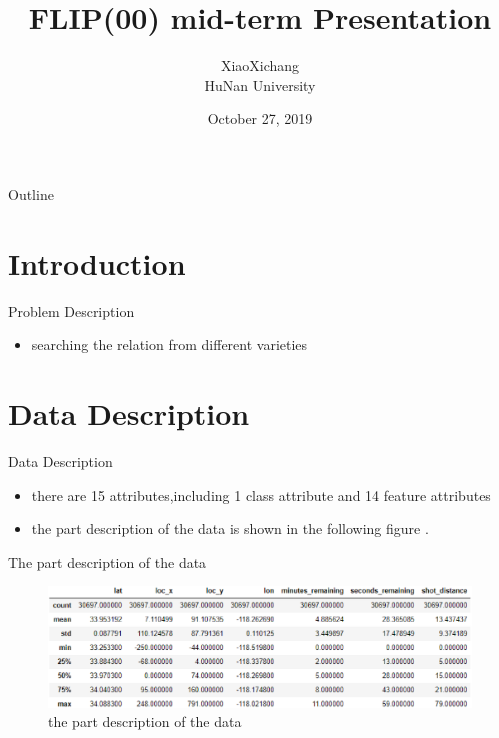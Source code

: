 \documentclass[
 size=14pt,
 paper=smartboard, %
 mode=present, %
 display=slides, %
style=tuliplab,
pauseslide,
fleqn,leqno]{powerdot}
\title{FLIP(00) mid-term Presentation}
\author{
XiaoXichang
\\
HuNan University 
}
\date{October 27, 2019}
\begin{document}
\maketitle 

\begin{slide}[toc=,bm=]{Outline}
\tableofcontents[content=sections]
\end{slide}

\section{Introduction}

\begin{slide}{Problem Description}
  \begin{itemize}
    \item  searching the relation from different varieties 
  \end{itemize}
\end{slide}


\section{Data Description}


\begin{slide}{Data Description}
\begin{itemize}
\item there are 15 attributes,including 1 class attribute and 14 feature attributes
\item the part description of the data is shown in the following figure .
\end{itemize}
\end{slide}

\begin{slide}{The part description of the data}
	\vspace*{10pt}
	\begin{figure}[htbp]
		\centering
		\includegraphics[scale=0.4]{1.eps}
		\caption{the part description of the data}
	\end{figure}
\end{slide}
\end{document}
